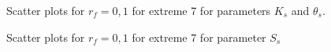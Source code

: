 \documentclass[review,times,3p,twocolumn,10pt]{elsarticle}
\begin{document}
\begin{figure}[htb!]
\label{ext6rf0-Kt2}
\caption{Scatter plots for $r_f=0,1$ for extreme 7 for parameters $K_s$ and $\theta_s$. }
\end{figure}

\begin{figure}[htb!]
\label{ext6rf0-Ss2}
\caption{Scatter plots for $r_f=0,1$ for extreme 7 for parameter $S_s$}
\end{figure}
\end{document}
